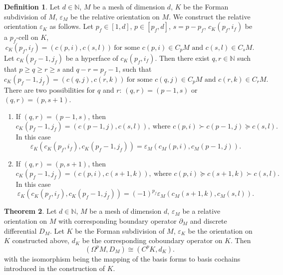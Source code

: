 \documentclass[fleqn]{article}
\theoremstyle{definition}
\newtheorem{theorem}{Theorem}[section]
\newtheorem{definition}[theorem]{Definition}
\begin{document}
\begin{definition}
  Let
    $d \in \mathbb{N}$,
    $M$ be a mesh of dimension $d$,
    $K$ be the Forman subdivision of $M$,
    $\varepsilon_M$ be the relative orientation on $M$.
  We construct the relative orientation $\varepsilon_K$ as follows.
  Let 
    $p_f \in [1, d]$,
    $p \in [p_f, d]$,
    $s = p - p_f$,
    $c_K(p_f, i_f)$ be a $p_f$-cell on $K$,
  \begin{equation}
    c_K(p_f, i_f) = (c(p, i), c(s, l))\
    \text{for some $c(p, i) \in C_p M$ and $c(s, l) \in C_s M$}.
  \end{equation}
  Let $c_K(p_f - 1, j_f)$ be a hyperface of $c_K(p_f, i_f)$.
  Then there exist $q, r \in \mathbb{N}$ such that
  $p \geq q \geq r \geq s$ and $q - r = p_f - 1$,
  such that
  \begin{equation}
    c_K(p_f - 1, j_f) = (c(q, j), c(r, k))\
    \text{for some $c(q, j) \in C_p M$ and $c(r, k) \in C_r M$}.
  \end{equation}
  There are two possibilities for $q$ and $r$:
  $(q, r) = (p - 1, s)$ or $(q, r) = (p, s + 1)$.
  \begin{enumerate}
    \item
      If $(q, r) = (p - 1, s)$, then
      \begin{equation}
        c_K(p_f - 1, j_f) = (c(p - 1, j), c(s, l)),\
        \text{where $c(p, i) \succ c(p - 1, j) \succeq c(s, l)$}.
      \end{equation}
      In this case
      \begin{equation}
        \varepsilon_K(c_K(p_f, i_f), c_K(p_f - 1, j_f))
        = \varepsilon_M(c_M(p, i), c_M(p - 1, j)).
      \end{equation}
    \item
      If $(q, r) = (p, s + 1)$, then
      \begin{equation}
        c_K(p_f - 1, j_f) = (c(p, i), c(s + 1, k)),\
        \text{where $c(p, i) \succeq c(s + 1, k) \succ c(s, l)$}.
      \end{equation}
      In this case
      \begin{equation}
        \varepsilon_K(c_K(p_f, i_f), c_K(p_f - 1, j_f))
        = (-1)^{p_f} \varepsilon_M(c_M(s + 1, k), c_M(s, l)).
      \end{equation}
  \end{enumerate}
\end{definition}

\begin{theorem}
  Let $d \in \mathbb{N}$, $M$ be a mesh of dimension $d$,
  $\varepsilon_M$ be a relative orientation on $M$ with corresponding boundary
  operator $\partial_M$ and discrete differential $D_M$.
  Let $K$ be the Forman subdivision of $M$,
  $\varepsilon_K$ be the orientation on $K$ constructed above,
  $d_K$ be the corresponding coboundary operator on $K$.
  Then
  \begin{equation}
    (\Omega^p M, D_M) \cong (C^p K, d_K).
  \end{equation}
  with the isomorphism being the mapping of the basis forms to basis cochains
  introduced in the construction of $K$.
\end{theorem}
\end{document}
